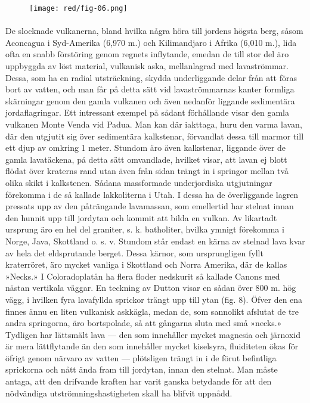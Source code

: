 \documentclass[a4paper, 12pt, oneside, swedish]{article}
\begin{document}
\begin{figure}[H]
\centering
\texttt{[image: red/fig-06.png]}
\caption{}
\end{figure}
\paragraph{}
De slocknade vulkanerna, bland hvilka några höra till jordens högsta berg, såsom Aconcagua i Syd-Amerika (6,970 m.) och Kilimandjaro i Afrika (6,010 m.), lida ofta en snabb förstöring genom regnets inflytande, emedan de till stor del äro uppbyggda av löst material, vulkanisk aska, mellanlagrad med lavaströmmar. Dessa, som ha en radial utsträckning, skydda underliggande delar från att föras bort av vatten, och man får på detta sätt vid lavaströmmarnas kanter formliga skärningar genom den gamla vulkanen och även nedanför liggande sedimentära jordaflagringar. Ett intressant exempel på sådant förhållande visar den gamla vulkanen Monte Venda vid Padua. Man kan där iakttaga, huru den varma lavan, där den utgjutit sig över sedimentära kalkstenar, förvandlat dessa till marmor till ett djup av omkring 1 meter. Stundom äro även kalkstenar, liggande över de gamla lavatäckena, på detta sätt omvandlade, hvilket visar, att lavan ej blott flödat över kraterns rand utan även från sidan trängt in i springor mellan två olika skikt i kalkstenen. Sådana massformade underjordiska utgjutningar förekomma i de så kallade lakkoliterna i Utah. I dessa ha de överliggande lagren pressats upp av den påträngande lavamassan, som emellertid har stelnat innan den hunnit upp till jordytan och kommit att bilda en vulkan. Av likartadt ursprung äro en hel del graniter, s. k. batholiter, hvilka ymnigt förekomma i Norge, Java, Skottland o. s. v. Stundom står endast en kärna av stelnad lava kvar av hela det eldsprutande berget. Dessa kärnor, som ursprungligen fyllt kraterröret, äro mycket vanliga i Skottland och Norra Amerika, där de kallas »Necks.» I Coloradoplatån ha flera floder nedskurit så kallade Canons med nästan vertikala väggar. En teckning av Dutton visar en sådan över 800 m. hög vägg, i hvilken fyra lavafyllda sprickor trängt upp till ytan (fig. 8). Öfver den ena finnes ännu en liten vulkanisk askkägla, medan de, som sannolikt afslutat de tre andra springorna, äro bortspolade, så att gångarna sluta med små »necks.» Tydligen har lättsmält lava --- den som innehåller mycket magnesia och järnoxid är mera lättflytande än den som innehåller mycket kiselsyra, fluiditeten ökas för öfrigt genom närvaro av vatten --- plötsligen trängt in i de förut befintliga sprickorna och nått ända fram till jordytan, innan den stelnat. Man måste antaga, att den drifvande kraften har varit ganska betydande för att den nödvändiga utströmningshastigheten skall ha blifvit uppnådd.
\end{document}

